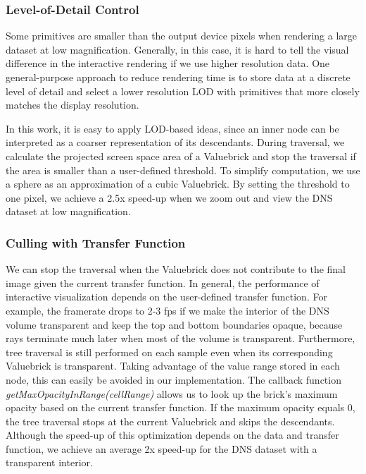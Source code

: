 \subsubsection{Level-of-Detail Control}
Some primitives are smaller than the output device pixels when rendering a
large dataset at low magnification\cite{rusinkiewicz2000qsplat}. Generally, in this case,
it is hard to tell the visual difference in the interactive rendering if we use higher resolution data. 
One general-purpose approach to 
reduce rendering time is to store data at a discrete level of detail and select a lower resolution LOD with primitives that more closely matches the display resolution. 

In this work, it is easy to apply LOD-based ideas, since an inner node can be interpreted as
a coarser representation of its descendants. During traversal, we calculate the projected
screen space area of a Valuebrick and stop the traversal if the area is smaller than a 
user-defined threshold. To simplify computation, we use a sphere as an approximation of a cubic
Valuebrick. By setting the threshold to one pixel, we achieve a 2.5x speed-up when we 
zoom out and view the DNS dataset at low magnification. 


\subsubsection{Culling with Transfer Function}
We can stop the traversal when the Valuebrick does not contribute to the 
final image given the current transfer function. In general, the performance of interactive visualization
depends on the user-defined transfer function.
For example, the framerate drops to 2-3 fps if we make the interior of the DNS volume transparent and keep the
top and bottom boundaries opaque, because rays terminate much later
when most of the volume is transparent. Furthermore, tree traversal is still performed on each
sample even when its corresponding Valuebrick is transparent. Taking advantage of the value
range stored in each node, this can easily be avoided in our implementation. The callback
function \textit{getMaxOpacityInRange(cellRange)} allows us to look up the brick's maximum
opacity based on the current transfer function.
If the maximum opacity equals 0, the tree traversal stops at the 
current Valuebrick and skips the descendants. Although the speed-up of this optimization
depends on the data and transfer function, we achieve an average 2x speed-up for
the DNS dataset with a transparent interior.



